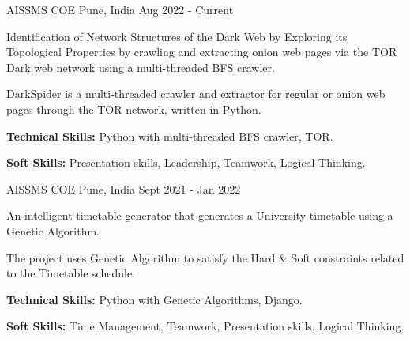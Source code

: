 

\begin{cventries}

  \cventry
    {AISSMS COE} %
    {} %
    {Pune, India} %
    {Aug 2022 - Current} %
    {
      \begin{cvitems} %
        \item {Identification of Network Structures of the Dark Web by Exploring its Topological Properties by crawling and extracting onion web pages via the TOR Dark web network using a multi-threaded BFS crawler.}
        \item {DarkSpider is a multi-threaded crawler and extractor for regular or onion web pages through the TOR network, written in Python.}
        \item {\textbf{Technical Skills:} Python with multi-threaded BFS crawler, TOR.}
        \item {\textbf{Soft Skills:} Presentation skills, Leadership, Teamwork, Logical Thinking.}
      \end{cvitems}
    }

  \cventry
    {AISSMS COE} %
    {} %
    {Pune, India} %
    {Sept 2021 - Jan 2022} %
    {
      \begin{cvitems} %
        \item {An intelligent timetable generator that generates a University timetable using a Genetic Algorithm.}
        \item {The project uses Genetic Algorithm to satisfy the Hard \& Soft constraints related to the Timetable schedule.}
        \item {\textbf{Technical Skills:} Python with Genetic Algorithms, Django.}
        \item {\textbf{Soft Skills:} Time Management, Teamwork, Presentation skills, Logical Thinking.}
      \end{cvitems}
    }


\end{cventries}
